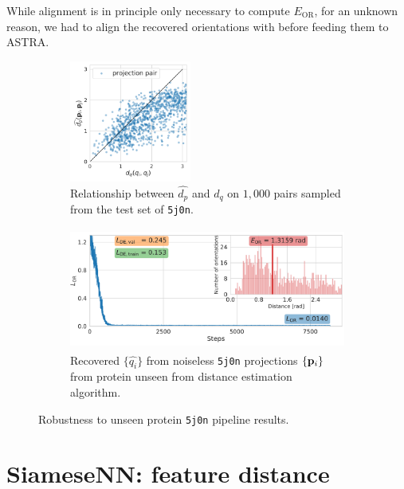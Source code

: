 While alignment is in principle only necessary to compute $E_\text{OR}$, for an unknown reason, we had to align the recovered orientations with  before feeding them to ASTRA\@.

\begin{figure}[ht!]
    \centering
    \begin{subfigure}[b]{0.35\linewidth}
        \centering
        \includegraphics[height=4cm]{figures/dPdQ_5j0n_robustness_to_unseen.pdf}
        \caption{Relationship between $\widehat{d_p}$ and $d_q$ on $1,000$ pairs sampled from the test set of \texttt{5j0n}.}
    \end{subfigure}
    \hfill
    \begin{subfigure}[b]{0.60\linewidth}
        \centering
        \includegraphics[height=4cm]{figures/5j0n_ar_aa_robustness_to_unseen.pdf}
        \caption{Recovered $\{ \widehat{q_i} \}$ from noiseless \texttt{5j0n} projections $\{ \mathbf{p}_i \}$ from protein unseen from distance estimation algorithm.}
    \end{subfigure}
    \caption{%
        Robustness to unseen protein \texttt{5j0n} pipeline results.
    }\label{fig:robustness-to-unseen-pipeline}
\end{figure}

\section{SiameseNN: feature distance}\label{apx:siamese:feature-distance}

